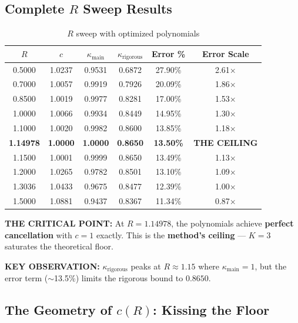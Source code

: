 \documentclass[11pt]{article}
\begin{document}
\subsection{Complete $R$ Sweep Results}

\begin{table}[h]
\centering
\caption{$R$ sweep with optimized polynomials}
\begin{tabular}{cccccc}
\toprule
$R$ & $c$ & $\kappa_{\text{main}}$ & $\kappa_{\text{rigorous}}$ & Error \% & Error Scale \\
\midrule
0.5000 & 1.0237 & 0.9531 & 0.6872 & 27.90\% & 2.61$\times$ \\
0.7000 & 1.0057 & 0.9919 & 0.7926 & 20.09\% & 1.86$\times$ \\
0.8500 & 1.0019 & 0.9977 & 0.8281 & 17.00\% & 1.53$\times$ \\
1.0000 & 1.0066 & 0.9934 & 0.8449 & 14.95\% & 1.30$\times$ \\
1.1000 & 1.0020 & 0.9982 & 0.8600 & 13.85\% & 1.18$\times$ \\
\rowcolor{yellow!30} \textbf{1.14978} & \textbf{1.0000} & \textbf{1.0000} & \textbf{0.8650} & \textbf{13.50\%} & \textbf{THE CEILING} \\
1.1500 & 1.0001 & 0.9999 & 0.8650 & 13.49\% & 1.13$\times$ \\
1.2000 & 1.0265 & 0.9782 & 0.8501 & 13.10\% & 1.09$\times$ \\
1.3036 & 1.0433 & 0.9675 & 0.8477 & 12.39\% & 1.00$\times$ \\
1.5000 & 1.0881 & 0.9437 & 0.8367 & 11.34\% & 0.87$\times$ \\
\bottomrule
\end{tabular}
\end{table}

\textbf{THE CRITICAL POINT:} At $R = 1.14978$, the polynomials achieve \textbf{perfect cancellation} with $c = 1$ exactly. This is the \textbf{method's ceiling} --- $K=3$ saturates the theoretical floor.

\textbf{KEY OBSERVATION:} $\kappa_{\text{rigorous}}$ peaks at $R \approx 1.15$ where $\kappa_{\text{main}} = 1$, but the error term ($\sim$13.5\%) limits the rigorous bound to $0.8650$.

\subsection{The Geometry of $c(R)$: Kissing the Floor}
\end{document}
